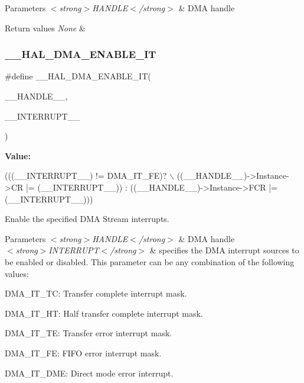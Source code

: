 \begin{DoxyParams}{Parameters}
{\em $<$strong$>$\+H\+A\+N\+D\+L\+E$<$/strong$>$} & D\+MA handle \\
\hline
\end{DoxyParams}

\begin{DoxyRetVals}{Return values}
{\em None} & \\
\hline
\end{DoxyRetVals}
\mbox{\label{group___d_m_a_ga2124233229c04ca90b790cd8cddfa98b}} 
\subsubsection{\texorpdfstring{\+\_\+\+\_\+\+H\+A\+L\+\_\+\+D\+M\+A\+\_\+\+E\+N\+A\+B\+L\+E\+\_\+\+IT}{\_\_HAL\_DMA\_ENABLE\_IT}}
{\footnotesize\ttfamily \#define \+\_\+\+\_\+\+H\+A\+L\+\_\+\+D\+M\+A\+\_\+\+E\+N\+A\+B\+L\+E\+\_\+\+IT(\begin{DoxyParamCaption}\item[{}]{\+\_\+\+\_\+\+H\+A\+N\+D\+L\+E\+\_\+\+\_\+,  }\item[{}]{\+\_\+\+\_\+\+I\+N\+T\+E\+R\+R\+U\+P\+T\+\_\+\+\_\+ }\end{DoxyParamCaption})}

{\bfseries Value\+:}
\begin{DoxyCode}
(((\_\_INTERRUPT\_\_) != DMA\_IT\_FE)? \(\backslash\)
((\_\_HANDLE\_\_)->Instance->CR |= (\_\_INTERRUPT\_\_)) : ((\_\_HANDLE\_\_)->Instance->FCR |= (\_\_INTERRUPT\_\_)))
\end{DoxyCode}


Enable the specified D\+MA Stream interrupts. 


\begin{DoxyParams}{Parameters}
{\em $<$strong$>$\+H\+A\+N\+D\+L\+E$<$/strong$>$} & D\+MA handle \\
\hline
{\em $<$strong$>$\+I\+N\+T\+E\+R\+R\+U\+P\+T$<$/strong$>$} & specifies the D\+MA interrupt sources to be enabled or disabled. This parameter can be any combination of the following values\+: \begin{DoxyItemize}
\item D\+M\+A\+\_\+\+I\+T\+\_\+\+TC\+: Transfer complete interrupt mask. \item D\+M\+A\+\_\+\+I\+T\+\_\+\+HT\+: Half transfer complete interrupt mask. \item D\+M\+A\+\_\+\+I\+T\+\_\+\+TE\+: Transfer error interrupt mask. \item D\+M\+A\+\_\+\+I\+T\+\_\+\+FE\+: F\+I\+FO error interrupt mask. \item D\+M\+A\+\_\+\+I\+T\+\_\+\+D\+ME\+: Direct mode error interrupt. \end{DoxyItemize}
\\
\hline
\end{DoxyParams}

